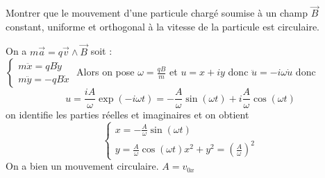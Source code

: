 \begin{Exercise}[title=]
		Montrer que le mouvement d'une particule chargé soumise à un champ $\vec{B}$ constant, uniforme et orthogonal à la vitesse de la particule est circulaire.
\end{Exercise}
\begin{Answer}
      On a $m\vec{a} = q\vec{v}\wedge \vec{B}$
      soit :\\
      $\begin{cases}
        m \ddot{x}= qB \dot{y} \\
        m \ddot{y}= -qB \dot{x}
      \end{cases}$
      Alors on pose $\omega = \frac{qB}{m}$ et $u=x+ iy$ donc $\ddot{u} = -i\omega\dot{u}$
      donc \[u= \frac{iA}{\omega}\exp(-i\omega t) =-\frac{A}{\omega}\sin(\omega t) +i \frac{A}{\omega}\cos(\omega t)\]
      on identifie les parties réelles et imaginaires et on obtient
      \[\begin{cases}
	      x = -\frac{A}{\omega}\sin(\omega t) \\
	      y =  \frac{A}{\omega}\cos(\omega t)
	      x^2 + y^2 = \left(\frac{A}{\omega}\right)^2

        \end{cases}
      \]
      On a bien un mouvement circulaire. $A = v_{0x}$
\end{Answer}

